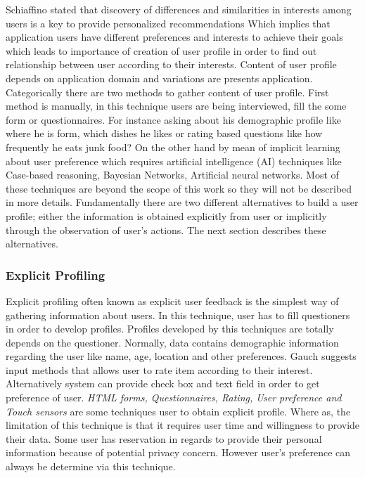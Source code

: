 Schiaffino \cite{schiaffino2009intelligent} stated that discovery of differences and similarities in interests among users is a key to provide personalized recommendations  Which implies that application users have different preferences and interests to achieve their goals which leads to importance of creation of user profile in order to find out relationship between user according to their interests. Content of user profile depends on application domain and variations are presents application. Categorically there are two methods to gather content of user profile. First method is manually, in this technique users are being interviewed, fill the some form or questionnaires. For instance asking about his demographic profile like where he is form, which dishes he likes or rating based questions like how frequently he eats junk food? On the other hand by mean of implicit learning about user preference which requires artificial intelligence (AI) techniques like Case-based reasoning, Bayesian Networks, Artificial neural networks. Most of these techniques are beyond the scope of this work so they will not be described in more details. Fundamentally there are two different alternatives to build a user profile; either the information is obtained explicitly from user or implicitly through the observation of user’s actions. The next section describes these alternatives.\newline

\subsubsection{Explicit Profiling}

Explicit profiling often known as explicit user feedback is the simplest way of gathering information about users. In this technique, user has to fill questioners in order to develop profiles. Profiles developed by this techniques are totally depends on the questioner. Normally, data contains demographic information regarding the user like name, age, location and other preferences. Gauch \cite{schiaffino2009intelligent} suggests input methods that allows user to rate item according to their interest. Alternatively system can provide check box and text field in order to get preference of user. \textit{HTML forms, Questionnaires, Rating, User preference and Touch sensors} are some techniques  user to obtain explicit profile. Where as, the limitation of this technique is that it requires user time and willingness to provide their data.  Some user has reservation in regards to provide their personal information because of potential privacy concern. However user’s preference can always be determine via this technique.\newline

